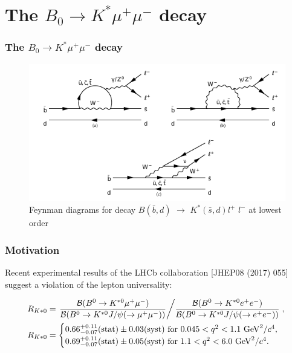 \documentclass{beamer}
\begin{document}




\section{The $B_0 \rightarrow K^* \mu^+ \mu^-$ decay }

\begin{frame}
  \frametitle{The $B_0 \rightarrow K^* \mu^+ \mu^-$ decay}

  \begin{figure}[H]
 \centering
 \includegraphics[width=0.8\linewidth]{figures/KstarFeynman}
 \caption{Feynman diagrams for decay $B(\bar{b},d)$ $\rightarrow$ $ K^*(\bar{s},d) l^+$ $l^-$ at lowest order}
 \label{fig:Feynman}
\end{figure}

\end{frame}

\begin{frame}
  \frametitle{Motivation}

Recent experimental results of the LHCb collaboration [JHEP08 (2017) 055] suggest a violation of the lepton universality:

  \begin{equation}
\begin{split}
R_{K*0} &= \left. \dfrac{\mathcal{B}(B^0 \rightarrow K^{*0} \mu^+ \mu^-)}{\mathcal{B}(B^0 \rightarrow K^{*0} J/\psi(\rightarrow \mu^+ \mu^-))} \middle/   \dfrac{\mathcal{B}(B^0 \rightarrow K^{*0} e^+ e^-)}{\mathcal{B} ( B^0 \rightarrow K^{*0} J/\psi(\rightarrow e^+ e^-))}  \right. , \\
R_{K*0} &=   \begin{cases}
  0.66^{+0.11}_{-0.07} (\text{stat}) \pm 0.03 (\text{syst}) \text{ for } 0.045 < q^2 < 1.1 \text{ GeV}^2/c^4, \\
  0.69^{+0.11}_{-0.07} (\text{stat}) \pm 0.05 (\text{syst}) \text{ for } 1.1 < q^2 < 6.0 \text{ GeV}^2/c^4.
\end{cases}
\end{split}
\end{equation}

\end{frame}
\end{document}
